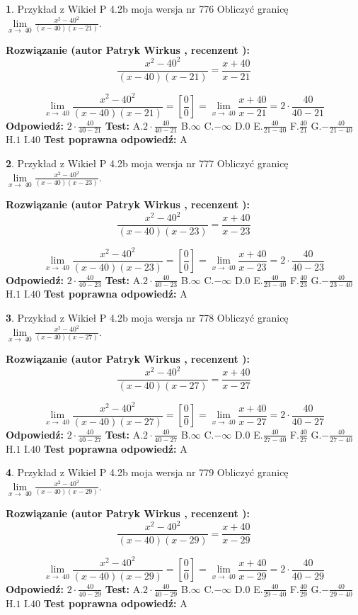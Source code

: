 \documentclass[12pt, a4paper]{article}
\theoremstyle{definition} %
\newtheorem{zad}{}
\newcommand{\zadStart}[1]{\begin{zad}#1\newline}
\newcommand{\zadStop}{\end{zad}}
\newcommand{\rozwStart}[2]{\noindent \textbf{Rozwiązanie (autor #1 , recenzent #2): }\newline}
\newcommand{\rozwStop}{\newline}
\newcommand{\odpStart}{\noindent \textbf{Odpowiedź:}\newline}
\newcommand{\odpStop}{\newline}
\newcommand{\testStart}{\noindent \textbf{Test:}\newline}
\newcommand{\testStop}{\newline}
\newcommand{\kluczStart}{\noindent \textbf{Test poprawna odpowiedź:}\newline}
\newcommand{\kluczStop}{\newline}
\begin{document}
\zadStart{Przykład z Wikieł P 4.2b moja wersja nr 776}
Obliczyć granicę $\lim\limits_{x\to\ 40}\frac{x^{2}-40^{2}}{(x-40)(x-21)}$.
\zadStop
\rozwStart{Patryk Wirkus}{}
$$\frac{x^{2}-40^{2}}{(x-40)(x-21)}=\frac{x+40}{x-21}$$

$$\lim\limits_{x\to\ 40}\frac{x^{2}-40^{2}}{(x-40)(x-21)}=[\frac{0}{0}]=\lim\limits_{x\to\ 40}\frac{x+40}{x-21}=2 \cdot \frac{40}{40-21}$$
\rozwStop
\odpStart
$2 \cdot \frac{40}{40-21}$
\odpStop
\testStart
A.$2 \cdot \frac{40}{40-21}$
B.$\infty$
C.$-\infty$
D.$0$
E.$\frac{40}{21-40}$
F.$\frac{40}{21}$
G.$-\frac{40}{21-40}$
H.$1$
I.$40$
\testStop
\kluczStart
A
\kluczStop



\zadStart{Przykład z Wikieł P 4.2b moja wersja nr 777}
Obliczyć granicę $\lim\limits_{x\to\ 40}\frac{x^{2}-40^{2}}{(x-40)(x-23)}$.
\zadStop
\rozwStart{Patryk Wirkus}{}
$$\frac{x^{2}-40^{2}}{(x-40)(x-23)}=\frac{x+40}{x-23}$$

$$\lim\limits_{x\to\ 40}\frac{x^{2}-40^{2}}{(x-40)(x-23)}=[\frac{0}{0}]=\lim\limits_{x\to\ 40}\frac{x+40}{x-23}=2 \cdot \frac{40}{40-23}$$
\rozwStop
\odpStart
$2 \cdot \frac{40}{40-23}$
\odpStop
\testStart
A.$2 \cdot \frac{40}{40-23}$
B.$\infty$
C.$-\infty$
D.$0$
E.$\frac{40}{23-40}$
F.$\frac{40}{23}$
G.$-\frac{40}{23-40}$
H.$1$
I.$40$
\testStop
\kluczStart
A
\kluczStop



\zadStart{Przykład z Wikieł P 4.2b moja wersja nr 778}
Obliczyć granicę $\lim\limits_{x\to\ 40}\frac{x^{2}-40^{2}}{(x-40)(x-27)}$.
\zadStop
\rozwStart{Patryk Wirkus}{}
$$\frac{x^{2}-40^{2}}{(x-40)(x-27)}=\frac{x+40}{x-27}$$

$$\lim\limits_{x\to\ 40}\frac{x^{2}-40^{2}}{(x-40)(x-27)}=[\frac{0}{0}]=\lim\limits_{x\to\ 40}\frac{x+40}{x-27}=2 \cdot \frac{40}{40-27}$$
\rozwStop
\odpStart
$2 \cdot \frac{40}{40-27}$
\odpStop
\testStart
A.$2 \cdot \frac{40}{40-27}$
B.$\infty$
C.$-\infty$
D.$0$
E.$\frac{40}{27-40}$
F.$\frac{40}{27}$
G.$-\frac{40}{27-40}$
H.$1$
I.$40$
\testStop
\kluczStart
A
\kluczStop



\zadStart{Przykład z Wikieł P 4.2b moja wersja nr 779}
Obliczyć granicę $\lim\limits_{x\to\ 40}\frac{x^{2}-40^{2}}{(x-40)(x-29)}$.
\zadStop
\rozwStart{Patryk Wirkus}{}
$$\frac{x^{2}-40^{2}}{(x-40)(x-29)}=\frac{x+40}{x-29}$$

$$\lim\limits_{x\to\ 40}\frac{x^{2}-40^{2}}{(x-40)(x-29)}=[\frac{0}{0}]=\lim\limits_{x\to\ 40}\frac{x+40}{x-29}=2 \cdot \frac{40}{40-29}$$
\rozwStop
\odpStart
$2 \cdot \frac{40}{40-29}$
\odpStop
\testStart
A.$2 \cdot \frac{40}{40-29}$
B.$\infty$
C.$-\infty$
D.$0$
E.$\frac{40}{29-40}$
F.$\frac{40}{29}$
G.$-\frac{40}{29-40}$
H.$1$
I.$40$
\testStop
\kluczStart
A
\kluczStop
\end{document}
